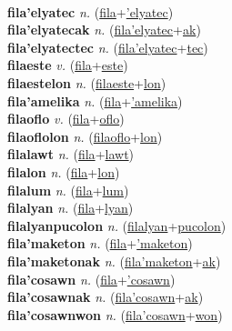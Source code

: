  \label{fila} \\
\textbf{fila'elyatec} \textit{n.} (\hyperref[fila]{fila}+\hyperref['elyatec]{'elyatec})
 \label{fila'elyatec} \\
\textbf{fila'elyatecak} \textit{n.} (\hyperref[fila'elyatec]{fila'elyatec}+\hyperref[ak]{ak})
 \label{fila'elyatecak} \\
\textbf{fila'elyatectec} \textit{n.} (\hyperref[fila'elyatec]{fila'elyatec}+\hyperref[tec]{tec})
 \label{fila'elyatectec} \\
\textbf{filaeste} \textit{v.} (\hyperref[fila]{fila}+\hyperref[este]{este})
 \label{filaeste} \\
\textbf{filaestelon} \textit{n.} (\hyperref[filaeste]{filaeste}+\hyperref[lon]{lon})
 \label{filaestelon} \\
\textbf{fila'amelika} \textit{n.} (\hyperref[fila]{fila}+\hyperref['amelika]{'amelika})
 \label{fila'amelika} \\
\textbf{filaoflo} \textit{v.} (\hyperref[fila]{fila}+\hyperref[oflo]{oflo})
 \label{filaoflo} \\
\textbf{filaoflolon} \textit{n.} (\hyperref[filaoflo]{filaoflo}+\hyperref[lon]{lon})
 \label{filaoflolon} \\
\textbf{filalawt} \textit{n.} (\hyperref[fila]{fila}+\hyperref[lawt]{lawt})
 \label{filalawt} \\
\textbf{filalon} \textit{n.} (\hyperref[fila]{fila}+\hyperref[lon]{lon})
 \label{filalon} \\
\textbf{filalum} \textit{n.} (\hyperref[fila]{fila}+\hyperref[lum]{lum})
 \label{filalum} \\
\textbf{filalyan} \textit{n.} (\hyperref[fila]{fila}+\hyperref[lyan]{lyan})
 \label{filalyan} \\
\textbf{filalyanpucolon} \textit{n.} (\hyperref[filalyan]{filalyan}+\hyperref[pucolon]{pucolon})
 \label{filalyanpucolon} \\
\textbf{fila'maketon} \textit{n.} (\hyperref[fila]{fila}+\hyperref['maketon]{'maketon})
 \label{fila'maketon} \\
\textbf{fila'maketonak} \textit{n.} (\hyperref[fila'maketon]{fila'maketon}+\hyperref[ak]{ak})
 \label{fila'maketonak} \\
\textbf{fila'cosawn} \textit{n.} (\hyperref[fila]{fila}+\hyperref['cosawn]{'cosawn})
 \label{fila'cosawn} \\
\textbf{fila'cosawnak} \textit{n.} (\hyperref[fila'cosawn]{fila'cosawn}+\hyperref[ak]{ak})
 \label{fila'cosawnak} \\
\textbf{fila'cosawnwon} \textit{n.} (\hyperref[fila'cosawn]{fila'cosawn}+\hyperref[won]{won})
